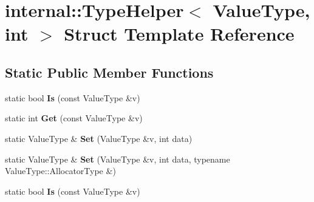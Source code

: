 \hypertarget{structinternal_1_1_type_helper_3_01_value_type_00_01int_01_4}{}\section{internal\+:\+:Type\+Helper$<$ Value\+Type, int $>$ Struct Template Reference}
\label{structinternal_1_1_type_helper_3_01_value_type_00_01int_01_4}
\subsection*{Static Public Member Functions}
\begin{DoxyCompactItemize}
\item 
static bool {\bfseries Is} (const Value\+Type \&v)\hypertarget{structinternal_1_1_type_helper_3_01_value_type_00_01int_01_4_aa17ef940501aac12fd7934ef979c607e}{}\label{structinternal_1_1_type_helper_3_01_value_type_00_01int_01_4_aa17ef940501aac12fd7934ef979c607e}

\item 
static int {\bfseries Get} (const Value\+Type \&v)\hypertarget{structinternal_1_1_type_helper_3_01_value_type_00_01int_01_4_a98c331ac026873b9ad4ba68e7bf28446}{}\label{structinternal_1_1_type_helper_3_01_value_type_00_01int_01_4_a98c331ac026873b9ad4ba68e7bf28446}

\item 
static Value\+Type \& {\bfseries Set} (Value\+Type \&v, int data)\hypertarget{structinternal_1_1_type_helper_3_01_value_type_00_01int_01_4_aceea0a0fac6684e53a9d9f66da4154cd}{}\label{structinternal_1_1_type_helper_3_01_value_type_00_01int_01_4_aceea0a0fac6684e53a9d9f66da4154cd}

\item 
static Value\+Type \& {\bfseries Set} (Value\+Type \&v, int data, typename Value\+Type\+::\+Allocator\+Type \&)\hypertarget{structinternal_1_1_type_helper_3_01_value_type_00_01int_01_4_a2ca21bedcaeaf0fffe913edb2fe1a66a}{}\label{structinternal_1_1_type_helper_3_01_value_type_00_01int_01_4_a2ca21bedcaeaf0fffe913edb2fe1a66a}

\item 
static bool {\bfseries Is} (const Value\+Type \&v)\hypertarget{structinternal_1_1_type_helper_3_01_value_type_00_01int_01_4_aa17ef940501aac12fd7934ef979c607e}{}\label{structinternal_1_1_type_helper_3_01_value_type_00_01int_01_4_aa17ef940501aac12fd7934ef979c607e}


\end{DoxyCompactItemize}
